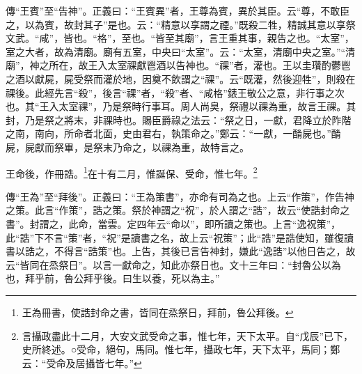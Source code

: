 {\noindent\zhuan{}\fzbyks 傳“王賓”至“告神”。正義曰：“王賓異”者，王尊為賓，異於其臣。云“尊，不敢臣之，以為賓，故封其子”是也。云：“精意以享謂之禋。”既殺二牲，精誠其意以享祭文武。“咸”，皆也。“格”，至也。“皆至其廟”，言王重其事，親告之也。“太室”，室之大者，故為清廟。廟有五室，中央曰“太室”。云：“太室，清廟中央之室。”“清廟”，神之所在，故王入太室祼獻鬯酒以告神也。“祼”者，灌也。王以圭瓚酌鬱鬯之酒以獻屍，屍受祭而灌於地，因奠不飲謂之“祼”。云“既灌，然後迎牲”，則殺在祼後。此經先言“殺”，後言“祼”者，“殺”者、“咸格”錶王敬公之意，非行事之次也。其“王入太室祼”，乃是祭時行事耳。周人尚臭，祭禮以祼為重，故言王祼。其封，乃是祭之將末，非祼時也。賜臣爵祿之法云：“祭之日，一獻，君降立於阼階之南，南向，所命者北面，史由君右，執策命之。”鄭云：“一獻，一酳屍也。”酳屍，屍獻而祭畢，是祭末乃命之，以祼為重，故特言之。 \par}

王命後，作冊誥。\footnote{王為冊書，使誥封命之書，皆同在烝祭日，拜前，魯公拜後。}在十有二月，惟誕保、受命，惟七年。\footnote{言攝政盡此十二月，大安文武受命之事，惟七年，天下太平。自“戊辰”已下，史所終述。○受命，絕句，馬同。惟七年，攝政七年，天下太平，馬同；鄭云：“受命及居攝皆七年。”}

{\noindent\zhuan{}\fzbyks 傳“王為”至“拜後”。正義曰：“王為策書”，亦命有司為之也。上云“作策”，作告神之策。此言“作策”，誥之策。祭於神謂之“祝”，於人謂之“誥”，故云“使誥封命之書”。封謂之，此命，當雲。定四年云“命以”，即所讀之策也。上言“逸祝策”，此“誥”下不言“策”者，“祝”是讀書之名，故上云“祝策”；此“誥”是誥使知，雖復讀書以誥之，不得言“誥策”也。上告，其後已言告神封，嫌此“逸誥”以他日告之，故云“皆同在烝祭日”。以言一獻命之，知此亦祭日也。文十三年曰：“封魯公以為也，拜乎前，魯公拜乎後。曰生以養，死以為主。” \par}

